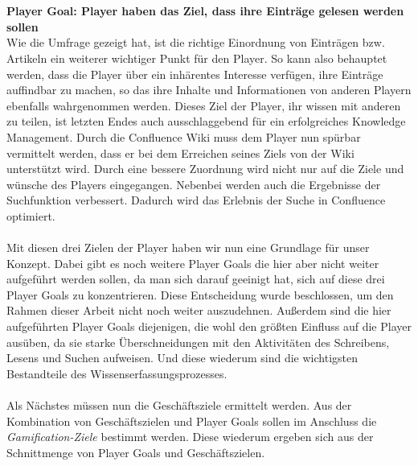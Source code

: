 \documentclass[a4paper,12pt,twoside]{scrartcl}
\begin{document}
\\\\
\textbf{Player Goal: Player haben das Ziel, dass ihre Einträge gelesen werden sollen}\\
Wie die Umfrage gezeigt hat, ist die richtige Einordnung von Einträgen bzw. Artikeln ein weiterer wichtiger Punkt für den Player. So kann also behauptet werden, dass die Player über ein inhärentes Interesse verfügen, ihre Einträge auffindbar zu machen, so das ihre Inhalte und Informationen von anderen Playern ebenfalls wahrgenommen werden. Dieses Ziel der Player, ihr wissen mit anderen zu teilen, ist letzten Endes auch ausschlaggebend für ein erfolgreiches Knowledge Management. Durch die Confluence Wiki muss dem Player nun spürbar vermittelt werden, dass er bei dem Erreichen seines Ziels von der Wiki unterstützt wird. Durch eine bessere Zuordnung wird nicht nur auf die Ziele und wünsche des Players eingegangen. Nebenbei werden auch die Ergebnisse der Suchfunktion verbessert. Dadurch wird das Erlebnis der Suche in Confluence optimiert.
\\\\
Mit diesen drei Zielen der Player haben wir nun eine Grundlage für unser Konzept. Dabei gibt es noch weitere Player Goals die hier aber nicht weiter aufgeführt werden sollen, da man sich darauf geeinigt hat, sich auf diese drei Player Goals zu konzentrieren. Diese Entscheidung wurde beschlossen, um den Rahmen dieser Arbeit nicht noch weiter auszudehnen. Außerdem sind die hier aufgeführten Player Goals diejenigen, die wohl den größten Einfluss auf die Player ausüben, da sie starke Überschneidungen mit den Aktivitäten des Schreibens, Lesens und Suchen aufweisen. Und diese wiederum sind die wichtigsten Bestandteile des Wissenserfassungsprozesses.
\\\\
Als Nächstes müssen nun die Geschäftsziele ermittelt werden. Aus der Kombination von Geschäftszielen und Player Goals sollen im Anschluss die \textit{Gamification-Ziele} bestimmt werden. Diese wiederum ergeben sich aus der Schnittmenge von Player Goals und Geschäftszielen.  
 
\end{document}
